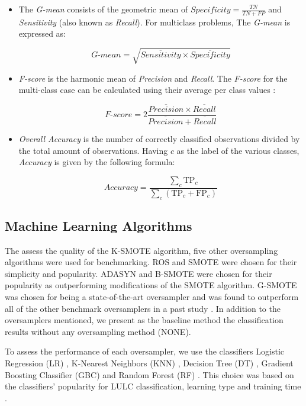 \documentclass[parskip=full]{scrartcl}
\begin{document}
\begin{itemize}
	\item The \textit{G-mean} consists of the geometric mean of
	      $Specificity = \frac{TN}{TN + FP}$ and \textit{Sensitivity} (also known as \textit{Recall}). For multiclass problems, The
	      \textit{G-mean} is expressed as:

	      $$\textit{G-mean} = \sqrt{ \overline{Sensitivity} \times
			      \overline{Specificity}}$$

	\item \textit{F-score} is the harmonic mean of \textit{Precision} and
	      \textit{Recall}. The \textit{F-score} for the multi-class case can
	      be calculated using their average per class values \cite{He2009}:

	      $$\textit{F-score}=2\frac{\overline{Precision} \times \overline{Recall}}{\overline{Precision} +
			      \overline{Recall}}$$

	\item \textit{Overall Accuracy} is the number of correctly classified observations
	      divided by the total amount of observations. Having \( c \) as the label of the
	      various classes, \textit{Accuracy} is given by the following formula:

	      $$\textit{Accuracy} = \frac{ \sum\limits_{c}{ \text{TP}_{c} } }{
			      \sum\limits_{c}{ (\text{TP}_{c}  + \text{FP}_{c}) } } $$

\end{itemize}

\subsection{Machine Learning Algorithms}
The assess the quality of the K-SMOTE algorithm, five other oversampling
algorithms were used for benchmarking. ROS and SMOTE were chosen for their
simplicity and popularity. ADASYN and B-SMOTE were chosen for their popularity
as outperforming modifications of the SMOTE algorithm. G-SMOTE was chosen for
being a state-of-the-art oversampler and was found to outperform all of the
other benchmark oversamplers in a past study \cite{Douzas2019rs}. In
addition to the oversamplers mentioned, we present as the baseline method the
classification results without any oversampling method (NONE).

To assess the performance of each oversampler, we use the classifiers Logistic
Regression (LR) \cite{McCullagh1989}, K-Nearest Neighbors (KNN)
\cite{Cover1967}, Decision Tree (DT) \cite{Salzberg1994}, Gradient
Boosting Classifier (GBC) \cite{Friedman2001} and Random Forest (RF)
\cite{Liaw2002}. This choice was based on the classifiers' popularity
for LULC classification, learning type and training time
\cite{Maxwell2018,Gavade2019}.
\end{document}
